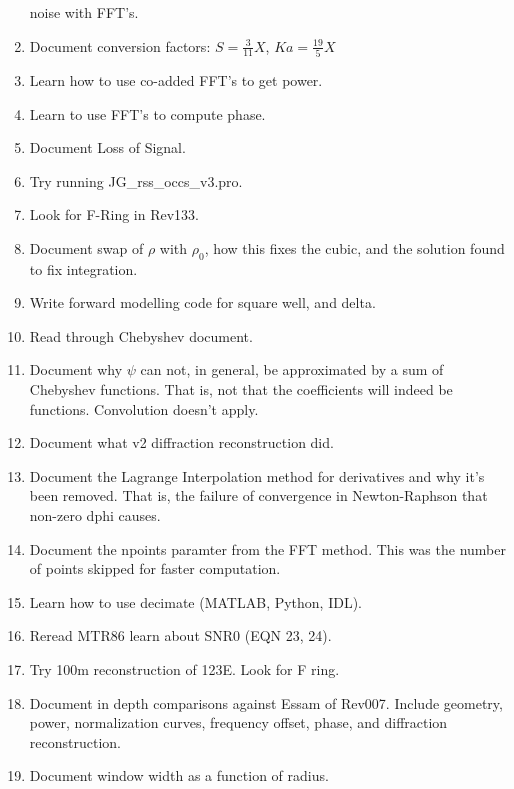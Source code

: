 \documentclass[crop=false,class=article,oneside]{standalone}
\begin{document}
\begin{enumerate}
                  noise with FFT's.
            \item Document conversion factors:
                  $S=\frac{3}{11}X$, $Ka=\frac{19}{5}X$
            \item Learn how to use co-added FFT's to get power.
            \item Learn to use FFT's to compute phase.
            \item Document Loss of Signal.
            \item Try running JG\_rss\_occs\_v3.pro.
            \item Look for F-Ring in Rev133.
            \item Document swap of $\rho$ with $\rho_{0}$, how this fixes
                  the cubic, and the solution found to fix integration.
            \item Write forward modelling code for square well, and delta.
            \item Read through Chebyshev document.
            \item Document why $\psi$ can not, in general, be
                  approximated by a sum of Chebyshev functions.
                  That is, not that the coefficients will indeed be
                  functions. Convolution doesn't apply.
            \item Document what v2 diffraction reconstruction did.
            \item Document the Lagrange Interpolation method for
                  derivatives and why it's been removed. That is,
                  the failure of convergence in Newton-Raphson that
                  non-zero dphi causes.
            \item Document the npoints paramter from the FFT method.
                  This was the number of points skipped for faster
                  computation.
            \item Learn how to use decimate (MATLAB, Python, IDL).
            \item Reread MTR86 learn about SNR0 (EQN 23, 24).
            \item Try 100m reconstruction of 123E. Look for F ring.
            \item Document in depth comparisons against Essam of Rev007.
                  Include geometry, power, normalization curves,
                  frequency offset, phase, and diffraction
                  reconstruction.
            \item Document window width as a function of radius.

\end{enumerate}
\end{document}
